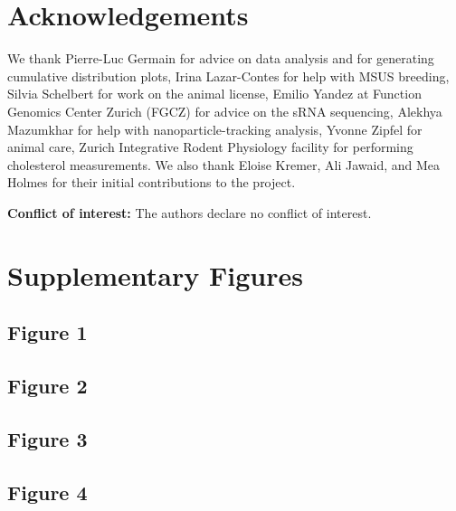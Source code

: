 \documentclass[12pt,twoside]{reedthesis}
\begin{document}
\hypertarget{acknowledgements}{%
\section{Acknowledgements}\label{acknowledgements}}

We thank Pierre-Luc Germain for advice on data analysis and for generating cumulative distribution plots, Irina Lazar-Contes for help with MSUS breeding, Silvia Schelbert for work on the animal license, Emilio Yandez at Function Genomics Center Zurich (FGCZ) for advice on the sRNA sequencing, Alekhya Mazumkhar for help with nanoparticle-tracking analysis, Yvonne Zipfel for animal care, Zurich Integrative Rodent Physiology facility for performing cholesterol measurements. We also thank Eloise Kremer, Ali Jawaid, and Mea Holmes for their initial contributions to the project.

\textbf{Conflict of interest:} The authors declare no conflict of interest.

\newpage

\hypertarget{supplementary-figures-1}{%
\section{Supplementary Figures}\label{supplementary-figures-1}}

\hypertarget{figure-1-1}{%
\subsection{Figure 1}\label{figure-1-1}}

\newpage

\hypertarget{figure-2-1}{%
\subsection{Figure 2}\label{figure-2-1}}

\newpage

\hypertarget{figure-3-1}{%
\subsection{Figure 3}\label{figure-3-1}}

\newpage

\hypertarget{figure-4-1}{%
\subsection{Figure 4}\label{figure-4-1}}
\end{document}
